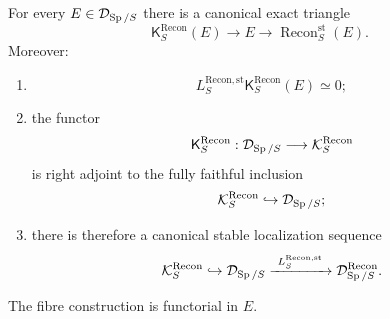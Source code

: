 \begin{proposition}
\label{prop:stable-reconstruction-defect-triangle}
For every \(E\in\mathcal D_{\operatorname{Sp}/S}\) there is a canonical exact triangle
\[
    \mathsf K^{\mathrm{Recon}}_S(E)
    \longrightarrow
    E
    \longrightarrow
    \operatorname{Recon}^{\mathrm{st}}_S(E).
\]
Moreover:
\begin{enumerate}[label=(\roman*)]
    \item
    \[
        L^{\mathrm{Recon},\mathrm{st}}_S
        \mathsf K^{\mathrm{Recon}}_S(E)
        \simeq0;
    \]
    \item the functor
    \[
        \mathsf K^{\mathrm{Recon}}_S:
        \mathcal D_{\operatorname{Sp}/S}\longrightarrow\mathcal K^{\mathrm{Recon}}_S
    \]
    is right adjoint to the fully faithful inclusion
    \[
        \mathcal K^{\mathrm{Recon}}_S
        \hookrightarrow
        \mathcal D_{\operatorname{Sp}/S};
    \]
    \item there is therefore a canonical stable localization sequence
    \[
        \mathcal K^{\mathrm{Recon}}_S
        \hookrightarrow
        \mathcal D_{\operatorname{Sp}/S}
        \xrightarrow{\ L^{\mathrm{Recon},\mathrm{st}}_S\ }
        \mathcal D^{\mathrm{Recon}}_{\operatorname{Sp}/S}.
    \]
\end{enumerate}
The fibre construction is functorial in \(E\).
\end{proposition}

